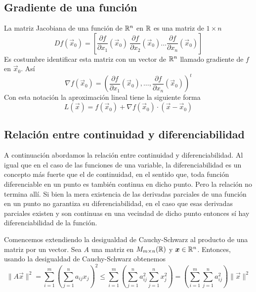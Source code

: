\subsection{Gradiente de una funci\'on}
\begin{definicion} La matriz Jacobiana de una funci\'on de $\mathbb{R}^n$ en $\mathbb{R}$ es una matriz de
$1\times n$
$$Df(\vec{x}_0)=\left[ \frac{\partial f}{\partial x_1}(\vec{x}_0) \: \frac{\partial f}
{\partial x_2}(\vec{x}_0)\dots \frac{\partial f}{\partial x_n}(\vec{x}_0) \right]
$$
Es costumbre identificar esta matriz con un vector de $\mathbb{R}^n$ llamado gradiente de $f$ en $\vec{x}_0$. As\'i
$$
 \nabla f(\vec{x}_0)=\left(\frac{\partial f}{\partial x_1}(\vec{x}_0),
\ldots,\frac{\partial f}{\partial x_n}(\vec{x}_0) \right)^t$$
Con esta notaci\'on la aproximaci\'on lineal tiene la siguiente forma
$$L(\vec{x})=f(\vec{x}_0)+\nabla f(\vec{x}_0)\cdot (\vec{x}-\vec{x}_{0})$$
\end{definicion}

\subsection{Relaci\'on entre continuidad y diferenciabilidad}
A continuaci\'on abordamos la relaci\'on entre continuidad y diferenciabilidad.
Al igual que en el caso de las funciones de una variable, la diferenciabilidad
es un concepto m\'as fuerte que el de continuidad, en el sentido que, toda 
funci\'on diferenciable en un punto es tambi\'en continua en dicho punto.
Pero la relaci\'on no termina all\'i. Si bien la mera existencia de las 
derivadas parciales de una funci\'on en un punto no garantiza su diferenciabilidad,
en el caso que esas derivadas parciales existen y son continuas en una 
vecindad de dicho punto entonces s\'i hay diferenciabilidad de la funci\'on.

Comencemos extendiendo la desigualdad de Cauchy-Schwarz al producto de una
matriz por un vector. Sea $A$ una matriz en $M_{m\times n}(\mathbb{R})$ y $\boldsymbol{x}\in\mathbb{R}^n$.
Entonces, usando la desigualdad de Cauchy-Schwarz obtenemos
\begin{equation}\label{cauchymatrices}
\|A\vec{x}\|^2=\sum_{i=1}^m\left(\sum_{j=1}^n a_{ij}x_j\right)^2
\leq\sum_{i=1}^m\left(\sum_{j=1}^na_{ij}^2\sum_{j=1}^nx_j^2\right)=
\left(\sum_{i=1}^m\sum_{j=1}^na_{ij}^2\right)\|\vec{x}\|^2
\end{equation}


